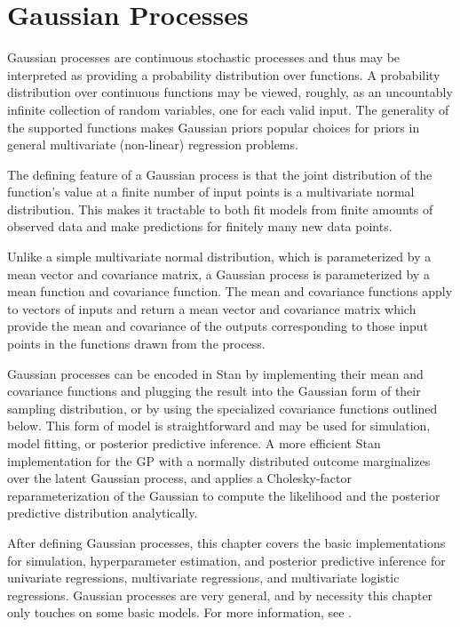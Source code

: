 \chapter{Gaussian Processes}\label{gaussian-processes.chapter}

\noindent
Gaussian processes are continuous stochastic processes and thus may be
interpreted as providing a probability distribution over functions.  A
probability distribution over continuous functions may be viewed,
roughly, as an uncountably infinite collection of random variables,
one for each valid input.  The generality of the supported functions
makes Gaussian priors popular choices for priors in general
multivariate (non-linear) regression problems.

The defining feature of a Gaussian process is that the joint distribution of
the function's value at a finite number of input points is a multivariate
normal distribution.  This makes it tractable to both fit models from finite
amounts of observed data and make predictions for finitely many new data
points.

Unlike a simple multivariate normal distribution, which is
parameterized by a mean vector and covariance matrix, a Gaussian
process is parameterized by a mean function and covariance function.
The mean and covariance functions apply to vectors of inputs and
return a mean vector and covariance matrix which provide the mean and
covariance of the outputs corresponding to those input points in the
functions drawn from the process.

Gaussian processes can be encoded in Stan by implementing their mean and
covariance functions and plugging the result into the Gaussian form of their
sampling distribution, or by using the specialized covariance functions
outlined below.  This form of model is straightforward and may be used for
simulation, model fitting, or posterior predictive inference. A more efficient
Stan implementation for the GP with a normally distributed outcome marginalizes
over the latent Gaussian process, and applies a Cholesky-factor
reparameterization of the Gaussian to compute the likelihood and the posterior
predictive distribution analytically.

After defining Gaussian processes, this chapter covers the basic
implementations for simulation, hyperparameter estimation, and
posterior predictive inference for univariate regressions,
multivariate regressions, and multivariate logistic regressions.
Gaussian processes are very general, and by necessity this chapter
only touches on some basic models.  For more information, see
\citep{RasmussenWilliams:2006}.


